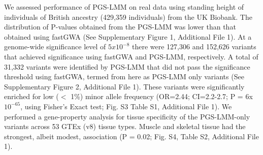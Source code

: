 \documentclass[doublespacing]{bmcart}
\begin{document}
We assessed performance of PGS-LMM on real data using standing height of individuals of British ancestry (429,359 individuals) from the UK Biobank. The distribution of P-values obtained from the PGS-LMM was lower than that obtained using fastGWA (See Supplementary  Figure 1, Additional File 1). At a genome-wide significance level of $5x10^{-8}$ there were 127,306 and 152,626 variants that achieved significance using fastGWA and PGS-LMM, respectively. A total of 31,332 variants were identified by PGS-LMM that did not pass the significance threshold using fastGWA, termed from here as PGS-LMM only variants (See Supplementary  Figure 2, Additional File 1).  These variants were significantly enriched for low ($<$ 1\%) minor allele frequency (OR=2.44; CI=2.2-2.7; P = 6x$10^{-65}$, using Fisher’s Exact test; Fig. S3 Table S1, Additional File 1).  We performed a gene-property analysis for tissue specificity of the PGS-LMM-only variants across 53 GTEx (v8) tissue types. Muscle and skeletal tissue had the strongest, albeit modest, association (P = 0.02; Fig. S4, Table S2, Additional File 1).  
\end{document}
